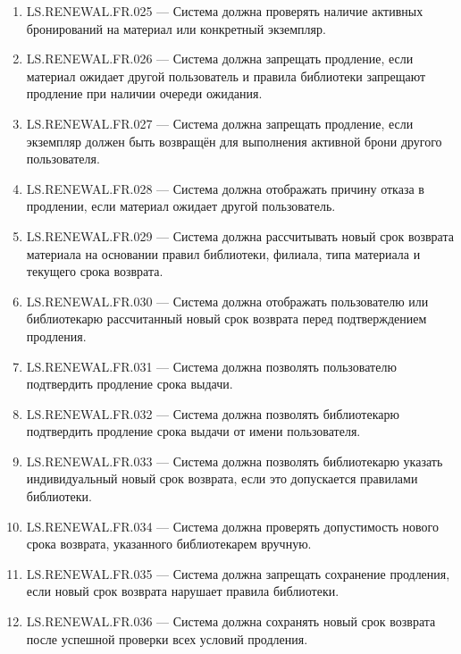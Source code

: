 \documentclass[12pt,a4paper]{article}
\begin{document}
\begin{enumerate}
		\item LS.RENEWAL.FR.025 --- Система должна проверять наличие активных бронирований
		на материал или конкретный экземпляр.
		
		\item LS.RENEWAL.FR.026 --- Система должна запрещать продление, если материал
		ожидает другой пользователь и правила библиотеки запрещают продление при
		наличии очереди ожидания.
		
		\item LS.RENEWAL.FR.027 --- Система должна запрещать продление, если экземпляр
		должен быть возвращён для выполнения активной брони другого пользователя.
		
		\item LS.RENEWAL.FR.028 --- Система должна отображать причину отказа в продлении,
		если материал ожидает другой пользователь.
		
		\item LS.RENEWAL.FR.029 --- Система должна рассчитывать новый срок возврата
		материала на основании правил библиотеки, филиала, типа материала и текущего
		срока возврата.
		
		\item LS.RENEWAL.FR.030 --- Система должна отображать пользователю или библиотекарю
		рассчитанный новый срок возврата перед подтверждением продления.
		
		\item LS.RENEWAL.FR.031 --- Система должна позволять пользователю подтвердить
		продление срока выдачи.
		
		\item LS.RENEWAL.FR.032 --- Система должна позволять библиотекарю подтвердить
		продление срока выдачи от имени пользователя.
		
		\item LS.RENEWAL.FR.033 --- Система должна позволять библиотекарю указать
		индивидуальный новый срок возврата, если это допускается правилами библиотеки.
		
		\item LS.RENEWAL.FR.034 --- Система должна проверять допустимость нового срока
		возврата, указанного библиотекарем вручную.
		
		\item LS.RENEWAL.FR.035 --- Система должна запрещать сохранение продления,
		если новый срок возврата нарушает правила библиотеки.
		
		\item LS.RENEWAL.FR.036 --- Система должна сохранять новый срок возврата после
		успешной проверки всех условий продления.
		

\end{enumerate}
\end{document}
